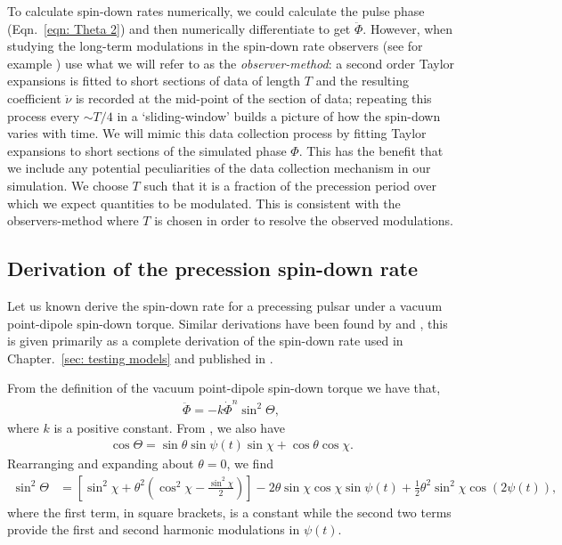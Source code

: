 \documentclass[../full_thesis/full_thesis.tex]{subfiles}
\begin{document}
To calculate spin-down rates numerically, we could calculate the pulse phase
(Eqn.~\eqref{eqn: Theta 2}) and then numerically differentiate to get
$\ddot{\Phi}$. However, when studying the long-term modulations in the spin-down
rate observers (see for example \citet{Lyne2010, Perera2015}) use what we will
refer to as the \emph{observer-method}: a second order Taylor expansions is
fitted to short sections of data of length $T$ and the resulting coefficient
$\ddot{\nu}$ is recorded at the mid-point of the section of data; repeating
this process every $\sim T/4$ in a `sliding-window' builds a picture of how the
spin-down varies with time.  We will mimic this data collection process by
fitting Taylor expansions to short sections of the simulated phase $\Phi$. This
has the benefit that we include any potential peculiarities of the data
collection mechanism in our simulation.  We choose $T$ such that it is a
fraction of the precession period over which we expect quantities to be
modulated. This is consistent with the observers-method where $T$ is chosen in
order to resolve the observed modulations.

\subsection{Derivation of the precession spin-down rate}
\label{sec: derivation of spin-down rate}
Let us known derive the spin-down rate for a precessing pulsar under a
vacuum point-dipole spin-down torque. Similar derivations have been found by
\citet{Link2001} and \citet{Jones2001}, this is given primarily as a complete
derivation of the spin-down rate used in Chapter.~\ref{sec: testing models}
and published in \citet{Ashton2016}.

From the definition of the vacuum point-dipole spin-down torque we have that,
\begin{align}
\ddot{\Phi} = -k \dot{\Phi}^{n} \sin^{2}\Theta,
\label{eqn: EM DE}
\end{align}
where $k$ is a positive constant. From \citet{Jones2001}, we also have
\begin{align}
\cos\Theta = \sin\theta \sin \psi(t) \sin \chi + \cos\theta \cos\chi.
\end{align}
Rearranging and expanding about $\theta = 0$, we find
\begin{align}
\sin^{2}\Theta & =
\left[
\sin^{2}\chi + \theta^{2}\left(\cos^{2}\chi - \frac{\sin^{2}\chi}{2}\right)
\right]
- 2\theta \sin\chi\cos\chi \sin\psi(t)
 + \frac{1}{2}\theta^{2}\sin^{2}\chi\cos(2\psi(t)),
\label{eqn: sin 2 Theta}
\end{align}
where the first term, in square brackets, is a constant while the second two
terms provide the first and second harmonic modulations in $\psi(t)$.
\end{document}
